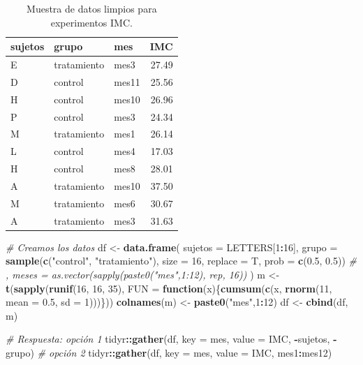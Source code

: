 \documentclass[]{article}
\newenvironment{Shaded}{\begin{snugshade}}{\end{snugshade}}
\newcommand{\KeywordTok}[1]{\textcolor[rgb]{0.13,0.29,0.53}{\textbf{#1}}}
\newcommand{\DataTypeTok}[1]{\textcolor[rgb]{0.13,0.29,0.53}{#1}}
\newcommand{\DecValTok}[1]{\textcolor[rgb]{0.00,0.00,0.81}{#1}}
\newcommand{\FloatTok}[1]{\textcolor[rgb]{0.00,0.00,0.81}{#1}}
\newcommand{\StringTok}[1]{\textcolor[rgb]{0.31,0.60,0.02}{#1}}
\newcommand{\CommentTok}[1]{\textcolor[rgb]{0.56,0.35,0.01}{\textit{#1}}}
\newcommand{\ControlFlowTok}[1]{\textcolor[rgb]{0.13,0.29,0.53}{\textbf{#1}}}
\newcommand{\OperatorTok}[1]{\textcolor[rgb]{0.81,0.36,0.00}{\textbf{#1}}}
\newcommand{\NormalTok}[1]{#1}
\begin{document}
\begin{table}[H]
\centering
\begin{tabular}{lllr}
  \hline
sujetos & grupo & mes & IMC \\ 
  \hline
E & tratamiento & mes3 & 27.49 \\ 
  D & control & mes11 & 25.56 \\ 
  H & control & mes10 & 26.96 \\ 
  P & control & mes3 & 24.34 \\ 
  M & tratamiento & mes1 & 26.14 \\ 
  L & control & mes4 & 17.03 \\ 
  H & control & mes8 & 28.01 \\ 
  A & tratamiento & mes10 & 37.50 \\ 
  M & tratamiento & mes6 & 30.67 \\ 
  A & tratamiento & mes3 & 31.63 \\ 
   \hline
\end{tabular}
\caption{Muestra de datos limpios para experimentos IMC.} 
\label{tab:sujetostidy}
\end{table}

\begin{Shaded}
\begin{Highlighting}[]
\CommentTok{# Creamos los datos}
\NormalTok{df <-}\StringTok{ }\KeywordTok{data.frame}\NormalTok{(}
  \DataTypeTok{sujetos =}\NormalTok{ LETTERS[}\DecValTok{1}\OperatorTok{:}\DecValTok{16}\NormalTok{],}
  \DataTypeTok{grupo =} \KeywordTok{sample}\NormalTok{(}\KeywordTok{c}\NormalTok{(}\StringTok{"control"}\NormalTok{, }\StringTok{"tratamiento"}\NormalTok{), }\DataTypeTok{size =} \DecValTok{16}\NormalTok{, }\DataTypeTok{replace =}\NormalTok{ T, }\DataTypeTok{prob =} \KeywordTok{c}\NormalTok{(}\FloatTok{0.5}\NormalTok{, }\FloatTok{0.5}\NormalTok{))}
  \CommentTok{# ,  meses = as.vector(sapply(paste0("mes",1:12), rep, 16))}
\NormalTok{  )}
\NormalTok{m <-}\StringTok{ }\KeywordTok{t}\NormalTok{(}\KeywordTok{sapply}\NormalTok{(}\KeywordTok{runif}\NormalTok{(}\DecValTok{16}\NormalTok{, }\DecValTok{16}\NormalTok{, }\DecValTok{35}\NormalTok{), }\DataTypeTok{FUN =} \ControlFlowTok{function}\NormalTok{(x)\{}\KeywordTok{cumsum}\NormalTok{(}\KeywordTok{c}\NormalTok{(x, }\KeywordTok{rnorm}\NormalTok{(}\DecValTok{11}\NormalTok{, }\DataTypeTok{mean =} \FloatTok{0.5}\NormalTok{, }\DataTypeTok{sd =} \DecValTok{1}\NormalTok{)))\}))}
\KeywordTok{colnames}\NormalTok{(m) <-}\StringTok{ }\KeywordTok{paste0}\NormalTok{(}\StringTok{"mes"}\NormalTok{,}\DecValTok{1}\OperatorTok{:}\DecValTok{12}\NormalTok{)}
\NormalTok{df <-}\StringTok{ }\KeywordTok{cbind}\NormalTok{(df, m)}

\CommentTok{# Respuesta: opción 1}
\NormalTok{tidyr}\OperatorTok{::}\KeywordTok{gather}\NormalTok{(df, }\DataTypeTok{key =}\NormalTok{ mes, }\DataTypeTok{value =}\NormalTok{ IMC, }\OperatorTok{-}\NormalTok{sujetos, }\OperatorTok{-}\NormalTok{grupo)}
\CommentTok{# opción 2}
\NormalTok{tidyr}\OperatorTok{::}\KeywordTok{gather}\NormalTok{(df, }\DataTypeTok{key =}\NormalTok{ mes, }\DataTypeTok{value =}\NormalTok{ IMC, mes1}\OperatorTok{:}\NormalTok{mes12)}
\end{Highlighting}
\end{Shaded}
\end{document}

